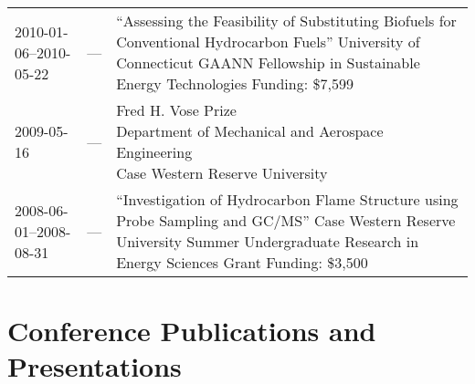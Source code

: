 \begin{center}
\begin{tabular}{lcl}
2010-01-06--2010-05-22 & --- & \makecell{``Assessing the Feasibility of Substituting Biofuels\\for Conventional Hydrocarbon Fuels'' \\
University of Connecticut GAANN Fellowship\\in Sustainable Energy Technologies \\
Funding: \$7,599} \\
2009-05-16 & --- & \makecell{Fred H. Vose Prize \\
Department of Mechanical and Aerospace Engineering\\Case Western Reserve University} \\
2008-06-01--2008-08-31 & --- & \makecell{``Investigation of Hydrocarbon Flame Structure\\using Probe Sampling and GC/MS'' \\
Case Western Reserve University Summer\\Undergraduate Research in Energy Sciences Grant \\
Funding: \$3,500}
\end{tabular}
\end{center}

\section{{\sectionfont Conference Publications and Presentations}}

